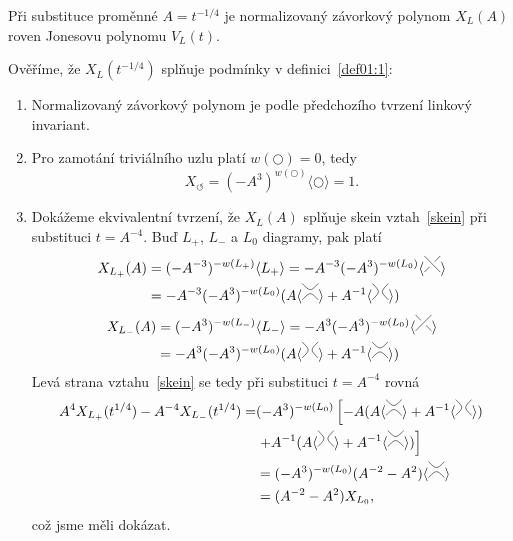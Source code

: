 \begin{tvrz}\label{t01:6}
Při substituce proměnné $A = t^{-1/4}$ je normalizovaný závorkový polynom $X_L(A)$  roven Jonesovu polynomu $V_L(t)$.
\end{tvrz}
\begin{dukaz}
Ověříme, že $X_L(t^{-1/4})$ splňuje podmínky v definici~\ref{def01:1}:

\begin{enumerate}
\item
Normalizovaný závorkový polynom je podle předchozího tvrzení linkový invariant.
\item
Pro zamotání triviálního uzlu platí $w( \bigcirc) = 0$, tedy $$X_\circlearrowleft = (-A^3)^{w( \bigcirc)} \langle \bigcirc  \rangle = 1.$$ 
\item
Dokážeme ekvivalentní tvrzení, že $X_L(A)$ splňuje skein vztah~\ref{skein} při substituci $t=A^{-4}$. Buď $L_+$, $ L_-$ a $L_0$ diagramy, pak platí
\begin{equation*}
\begin{split}
X_{L_+}(A) & = (-A^{-3})^{-w(L_+)} \langle L_+ \rangle = -A^{-3} (-A^3)^{-w(L_0)}  \langle \minuskriz  \rangle \\ & = -A^{-3} (-A^3)^{-w(L_0)} (A \langle \horkriz \rangle + A^{-1}  \langle \vertkriz \rangle) 
\end{split}
\end{equation*}
\begin{equation*}
\begin{split}
X_{L_-}(A) & = (-A^{3})^{-w(L_-)} \langle L_- \rangle = -A^{3} (-A^3)^{-w(L_0)}  \langle \pluskriz  \rangle \\ & = -A^{3} (-A^3)^{-w(L_0)} (A \langle \vertkriz \rangle + A^{-1}  \langle \horkriz \rangle) 
\end{split}
\end{equation*}
Levá strana vztahu~\ref{skein} se tedy při substituci $t=A^{-4}$ rovná
\begin{equation*}
\begin{split}
A^4 X_{L_+}(t^{1/4})  - A^{-4} X_{L_-} (t^{1/4})  = & (-A^3)^{-w(L_0)} \left[ -A  (A \langle \horkriz \rangle + A^{-1}  \langle \vertkriz \rangle ) \right. \\ & \left. + A^{-1} (A \langle \vertkriz \rangle + A^{-1}  \langle \horkriz \rangle) \right] \\ & = (-A^3)^{-w(L_0)} (A^{-2} -A^2) \langle \horkriz \rangle \\ & =  (A^{-2} -A^2) X_{L_0},
\end{split}
\end{equation*}
což jsme měli dokázat.
\end{enumerate}
$ $
\end{dukaz}
